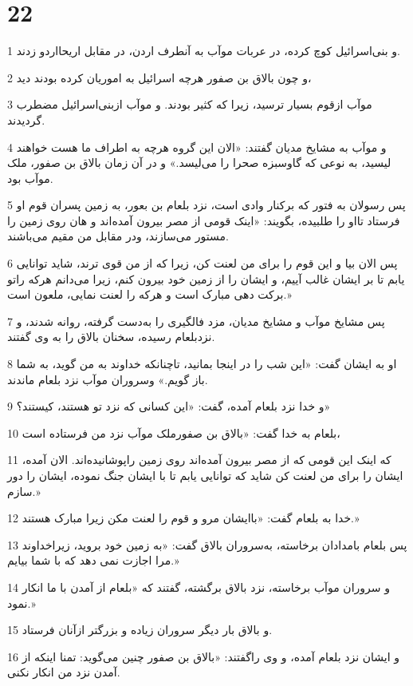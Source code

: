 \chapter{22}

\par 1 و بنی‌اسرائیل کوچ کرده، در عربات موآب به آنطرف اردن، در مقابل اریحااردو زدند.
\par 2 و چون بالاق بن صفور هر‌چه اسرائیل به اموریان کرده بودند دید،
\par 3 موآب ازقوم بسیار ترسید، زیرا که کثیر بودند. و موآب ازبنی‌اسرائیل مضطرب گردیدند.
\par 4 و موآب به مشایخ مدیان گفتند: «الان این گروه هر‌چه به اطراف ما هست خواهند لیسید، به نوعی که گاوسبزه صحرا را می‌لیسد.» و در آن زمان بالاق بن صفور، ملک موآب بود.
\par 5 پس رسولان به فتور که برکنار وادی است، نزد بلعام بن بعور، به زمین پسران قوم او فرستاد تااو را طلبیده، بگویند: «اینک قومی از مصر بیرون آمده‌اند و هان روی زمین را مستور می‌سازند، ودر مقابل من مقیم می‌باشند.
\par 6 پس الان بیا و این قوم را برای من لعنت کن، زیرا که از من قوی ترند، شاید توانایی یابم تا بر ایشان غالب آییم، و ایشان را از زمین خود بیرون کنم، زیرا می‌دانم هر‌که راتو برکت دهی مبارک است و هر‌که را لعنت نمایی، ملعون است.»
\par 7 پس مشایخ موآب و مشایخ مدیان، مزد فالگیری را به‌دست گرفته، روانه شدند، و نزدبلعام رسیده، سخنان بالاق را به وی گفتند.
\par 8 او به ایشان گفت: «این شب را در اینجا بمانید، تاچنانکه خداوند به من گوید، به شما باز گویم.» وسروران موآب نزد بلعام ماندند.
\par 9 و خدا نزد بلعام آمده، گفت: «این کسانی که نزد تو هستند، کیستند؟»
\par 10 بلعام به خدا گفت: «بالاق بن صفورملک موآب نزد من فرستاده است،
\par 11 که اینک این قومی که از مصر بیرون آمده‌اند روی زمین راپوشانیده‌اند. الان آمده، ایشان را برای من لعنت کن شاید که توانایی یابم تا با ایشان جنگ نموده، ایشان را دور سازم.»
\par 12 خدا به بلعام گفت: «باایشان مرو و قوم را لعنت مکن زیرا مبارک هستند.»
\par 13 پس بلعام بامدادان برخاسته، به‌سروران بالاق گفت: «به زمین خود بروید، زیراخداوند مرا اجازت نمی دهد که با شما بیایم.»
\par 14 و سروران موآب برخاسته، نزد بالاق برگشته، گفتند که «بلعام از آمدن با ما انکار نمود.»
\par 15 و بالاق بار دیگر سروران زیاده و بزرگتر ازآنان فرستاد.
\par 16 و ایشان نزد بلعام آمده، و وی راگفتند: «بالاق بن صفور چنین می‌گوید: تمنا اینکه از آمدن نزد من انکار نکنی.
